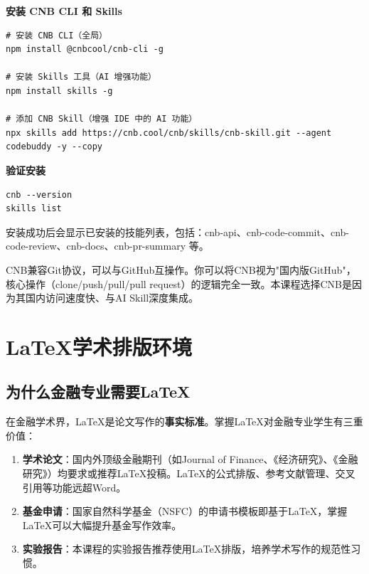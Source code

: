 \textbf{安装 CNB CLI 和 Skills}

\begin{lstlisting}[style=shell]
# 安装 CNB CLI（全局）
npm install @cnbcool/cnb-cli -g

# 安装 Skills 工具（AI 增强功能）
npm install skills -g

# 添加 CNB Skill（增强 IDE 中的 AI 功能）
npx skills add https://cnb.cool/cnb/skills/cnb-skill.git --agent codebuddy -y --copy
\end{lstlisting}

\textbf{验证安装}

\begin{lstlisting}[style=shell]
cnb --version
skills list
\end{lstlisting}

安装成功后会显示已安装的技能列表，包括：cnb-api、cnb-code-commit、cnb-code-review、cnb-docs、cnb-pr-summary 等。

\begin{notebox}[CNB与GitHub的关系]
CNB兼容Git协议，可以与GitHub互操作。你可以将CNB视为"国内版GitHub"，核心操作（clone/push/pull/pull request）的逻辑完全一致。本课程选择CNB是因为其国内访问速度快、与AI Skill深度集成。
\end{notebox}

\section{LaTeX学术排版环境}

\subsection{为什么金融专业需要LaTeX}

在金融学术界，LaTeX是论文写作的\textbf{事实标准}。掌握LaTeX对金融专业学生有三重价值：

\begin{enumerate}[leftmargin=2em]
  \item \textbf{学术论文}：国内外顶级金融期刊（如Journal of Finance、《经济研究》、《金融研究》）均要求或推荐LaTeX投稿。LaTeX的公式排版、参考文献管理、交叉引用等功能远超Word。
  \item \textbf{基金申请}：国家自然科学基金（NSFC）的申请书模板即基于LaTeX，掌握LaTeX可以大幅提升基金写作效率。
  \item \textbf{实验报告}：本课程的实验报告推荐使用LaTeX排版，培养学术写作的规范性习惯。
\end{enumerate}

